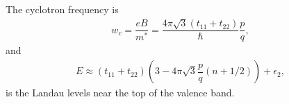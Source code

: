 \documentclass{report}
\newcommand{\f}[2]{\dfrac{#1}{#2}}
\begin{document}
The cyclotron frequency is
\begin{gather}
	w_{c} = \f{eB}{m^{*}} = \f{4 \pi \sqrt{3} (t_{11} + t_{22})}{\hbar} \f{p}{q},
\end{gather}
and
\begin{gather}
	E \approx (t_{11} + t_{22}) \left(3 - 4\pi \sqrt{3} \f{p}{q}(n + 1/ 2)\right) + \epsilon_{2},
\end{gather}
is the Landau levels near the top of the valence band.

\end{document}
